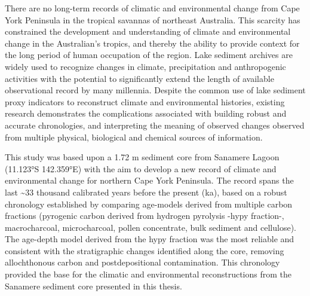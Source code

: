 \documentclass[
  12pt,
]{book}
\begin{document}
There are no long-term records of climatic and environmental change from Cape York Peninsula in the tropical savannas of northeast Australia. This scarcity has constrained the development and understanding of climate and environmental change in the Australian's tropics, and thereby the ability to provide context for the long period of human occupation of the region. Lake sediment archives are widely used to recognize changes in climate, precipitation and anthropogenic activities with the potential to significantly extend the length of available observational record by many millennia. Despite the common use of lake sediment proxy indicators to reconstruct climate and environmental histories, existing research demonstrates the complications associated with building robust and accurate chronologies, and interpreting the meaning of observed changes observed from multiple physical, biological and chemical sources of information.

This study was based upon a 1.72 m sediment core from Sanamere Lagoon (11.123°S 142.359°E) with the aim to develop a new record of climate and environmental change for northern Cape York Peninsula. The record spans the last \textasciitilde33 thousand calibrated years before the present (ka), based on a robust chronology established by comparing age-models derived from multiple carbon fractions (pyrogenic carbon derived from hydrogen pyrolysis -hypy fraction-, macrocharcoal, microcharcoal, pollen concentrate, bulk sediment and cellulose). The age-depth model derived from the hypy fraction was the most reliable and consistent with the stratigraphic changes identified along the core, removing allochthonous carbon and postdepositional contamination. This chronology provided the base for the climatic and environmental reconstructions from the Sanamere sediment core presented in this thesis.
\end{document}
